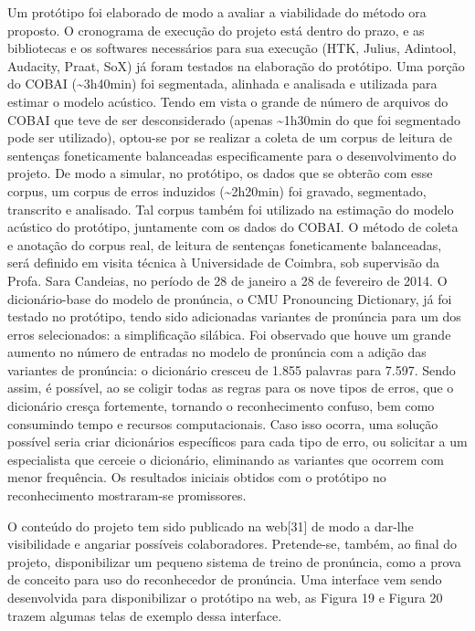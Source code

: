 Um prot\'otipo foi elaborado de modo a avaliar a viabilidade do m\'etodo ora
proposto. O cronograma de execu\c{c}\~ao do projeto est\'a dentro do prazo, e as
bibliotecas e os softwares necess\'arios para sua execu\c{c}\~ao (HTK, Julius,
Adintool, Audacity, Praat, SoX) j\'a foram testados na elabora\c{c}\~ao do
prot\'otipo. Uma por\c{c}\~ao do COBAI (\textasciitilde{}3h40min) foi
segmentada, alinhada e analisada e utilizada para estimar o modelo
ac\'ustico. Tendo em vista o grande de n\'umero de arquivos do COBAI que
teve de ser desconsiderado (apenas \textasciitilde{}1h30min do que foi
segmentado pode ser utilizado), optou-se por se realizar a coleta de um
corpus de leitura de senten\c{c}as foneticamente balanceadas especificamente
para o desenvolvimento do projeto. De modo a simular, no prot\'otipo, os
dados que se obter\~ao com esse corpus, um corpus de erros induzidos
(\textasciitilde{}2h20min) foi gravado, segmentado, transcrito e
analisado. Tal corpus tamb\'em foi utilizado na estima\c{c}\~ao do modelo
ac\'ustico do prot\'otipo, juntamente com os dados do COBAI. O m\'etodo de
coleta e anota\c{c}\~ao do corpus real, de leitura de senten\c{c}as foneticamente
balanceadas, ser\'a definido em visita t\'ecnica à Universidade de Coimbra,
sob supervis\~ao da Profa. Sara Candeias, no per\'iodo de 28 de janeiro a 28
de fevereiro de 2014. O dicion\'ario-base do modelo de pron\'uncia, o CMU
Pronouncing Dictionary, j\'a foi testado no prot\'otipo, tendo sido
adicionadas variantes de pron\'uncia para um dos erros selecionados: a
simplifica\c{c}\~ao sil\'abica. Foi observado que houve um grande aumento no
n\'umero de entradas no modelo de pron\'uncia com a adi\c{c}\~ao das variantes de
pron\'uncia: o dicion\'ario cresceu de 1.855 palavras para 7.597. Sendo
assim, \'e poss\'ivel, ao se coligir todas as regras para os nove tipos de
erros, que o dicion\'ario cres\c{c}a fortemente, tornando o reconhecimento
confuso, bem como consumindo tempo e recursos computacionais. Caso isso
ocorra, uma solu\c{c}\~ao poss\'ivel seria criar dicion\'arios espec\'ificos para
cada tipo de erro, ou solicitar a um especialista que cerceie o
dicion\'ario, eliminando as variantes que ocorrem com menor frequ\^encia. Os
resultados iniciais obtidos com o prot\'otipo no reconhecimento
mostraram-se promissores.

O conte\'udo do projeto tem sido publicado na web{[}31{]} de modo a
dar-lhe visibilidade e angariar poss\'iveis colaboradores. Pretende-se,
tamb\'em, ao final do projeto, disponibilizar um pequeno sistema de treino
de pron\'uncia, como a prova de conceito para uso do reconhecedor de
pron\'uncia. Uma interface vem sendo desenvolvida para disponibilizar o
prot\'otipo na web, as Figura 19 e Figura 20 trazem algumas telas de
exemplo dessa interface.

